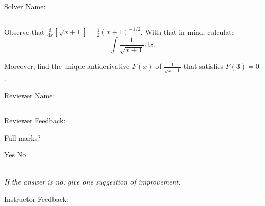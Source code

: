 \documentclass[12pt]{exam}
\begin{document}
\pagestyle{headandfoot}
\firstpageheadrule

Solver Name:\enspace\rule{5cm}{0.8pt}

\begin{questions}
\question

Observe that $\frac{\mathrm{d}}{\mathrm{d}x}\left[ \sqrt{x+1} \right] = \frac12 (x+1)^{-1/2}$. With that in mind, calculate
\[\int \frac1{\sqrt{x+1}} \,\mathrm{d}x.\]

Moreover, find the unique antiderivative $F(x)$ of $\frac1{\sqrt{x+1}}$ that satisfies $F(3) = 0$.

\end{questions}

Reviewer Name:\enspace\rule{5cm}{0.8pt}

\begin{questions}
\question
Reviewer Feedback:

Full marks? \begin{oneparcheckboxes}
\choice Yes
\choice No
\end{oneparcheckboxes}\\
\textit{If the answer is no, give one suggestion of improvement.}

\question

Instructor Feedback:



\end{questions}
\end{document}
